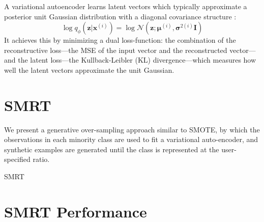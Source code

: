 \documentclass[twoside,11pt]{article}
\begin{document}
A variational autoencoder learns latent vectors which typically approximate a posterior unit Gaussian distribution with a diagonal covariance structure \citep{kingma2013auto}:
\[
    \log q_{\phi}(\mathbf{z}|\mathbf{x}^{(i)}) = \log \mathcal{N}(\mathbf{z}; \bm{\mu}^{(i)}, \bm{\sigma}^{2(i)}\mathbf{I})
\]
It achieves this by minimizing a dual loss-function: the combination of the reconstructive loss---the MSE of the input vector and the reconstructed vector---and the latent loss---the Kullback-Leibler (KL) divergence---which measures how well the latent vectors approximate the unit Gaussian.

\section{SMRT}

We present a generative over-sampling approach similar to SMOTE, by which the observations in each minority class are used to fit a variational auto-encoder, and synthetic examples are generated until the class is represented at the user-specified ratio. \\

\makeatletter
\def\BState{\State\hskip-\ALG@thistlm}
\makeatother

\begin{algorithm}
\caption{SMRT}\label{smrt}
\end{algorithm}

\section{SMRT Performance}
\end{document}
